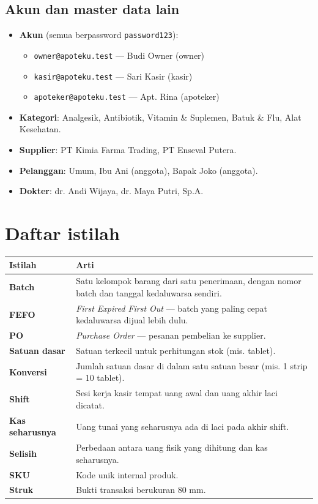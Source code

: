\documentclass[11pt,a4paper]{article}
\newcommand{\code}[1]{\texttt{\small #1}}
\begin{document}
\subsection{Akun dan master data lain}
\begin{itemize}[leftmargin=1.4em,itemsep=0.3em]
  \item \textbf{Akun} (semua berpassword \code{password123}):
    \begin{itemize}[leftmargin=1.2em,itemsep=0.15em,topsep=0.2em]
      \item \code{owner@apoteku.test} --- Budi Owner (owner)
      \item \code{kasir@apoteku.test} --- Sari Kasir (kasir)
      \item \code{apoteker@apoteku.test} --- Apt. Rina (apoteker)
    \end{itemize}
  \item \textbf{Kategori}: Analgesik, Antibiotik, Vitamin \& Suplemen, Batuk \&
        Flu, Alat Kesehatan.
  \item \textbf{Supplier}: PT Kimia Farma Trading, PT Enseval Putera.
  \item \textbf{Pelanggan}: Umum, Ibu Ani (anggota), Bapak Joko (anggota).
  \item \textbf{Dokter}: dr. Andi Wijaya, dr. Maya Putri, Sp.A.
\end{itemize}

\section{Daftar istilah}

\begin{tabularx}{\textwidth}{@{}L{4.2cm}Y@{}}
  \toprule
  \textbf{Istilah} & \textbf{Arti} \\
  \midrule
  \textbf{Batch} & Satu kelompok barang dari satu penerimaan, dengan nomor batch dan tanggal kedaluwarsa sendiri. \\
  \textbf{FEFO} & \emph{First Expired First Out} --- batch yang paling cepat kedaluwarsa dijual lebih dulu. \\
  \textbf{PO} & \emph{Purchase Order} --- pesanan pembelian ke supplier. \\
  \textbf{Satuan dasar} & Satuan terkecil untuk perhitungan stok (mis. tablet). \\
  \textbf{Konversi} & Jumlah satuan dasar di dalam satu satuan besar (mis. 1 strip = 10 tablet). \\
  \textbf{Shift} & Sesi kerja kasir tempat uang awal dan uang akhir laci dicatat. \\
  \textbf{Kas seharusnya} & Uang tunai yang seharusnya ada di laci pada akhir shift. \\
  \textbf{Selisih} & Perbedaan antara uang fisik yang dihitung dan kas seharusnya. \\
  \textbf{SKU} & Kode unik internal produk. \\
  \textbf{Struk} & Bukti transaksi berukuran 80 mm. \\
  \bottomrule
\end{tabularx}
\end{document}
